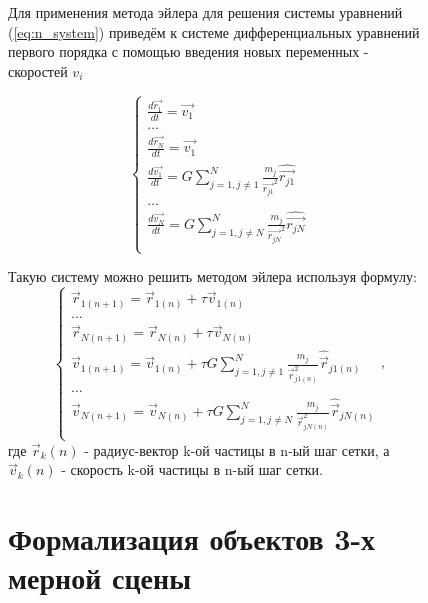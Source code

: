 \begin{figure}[h]
Для применения метода эйлера для решения системы уравнений (\ref{eq:n_system}) приведём к системе дифференциальных уравнений первого порядка с помощью введения новых переменных - скоростей $v_i$ 

\begin{equation}
	\label{n_system_velocities}
	\begin{cases}
		\frac{d\vec{r_1}}{dt} = \vec{v_1} \\
		\dots \\
		\frac{d\vec{r_N}}{dt} = \vec{v_1} \\
		
		\frac{d\vec{v_1}}{dt} = G\sum_{j=1, j \neq 1}^{N}{\frac{m_j}{\vec{r_{j1}}^2}\hat{\vec{r_{j1}}}} \\
		\dots \\
		\frac{d\vec{v_N}}{dt} = G\sum_{j=1, j \neq N}^{N}{\frac{m_j}{\vec{r_{jN}}^2}\hat{\vec{r_{jN}}}} \\
	\end{cases}
\end{equation}

Такую систему можно решить методом эйлера используя формулу:
\begin{equation}
	\label{n_euler_velocities}
	\begin{cases}
		\vec{r}_{1(n+1)} = \vec{r}_{1(n)} + \tau \vec{v}_{1(n)} \\
		\dots \\
		\vec{r}_{N(n+1)} = \vec{r}_{N(n)} + \tau \vec{v}_{N(n)} \\
		
		
		\vec{v}_{1(n+1)} = \vec{v}_{1(n)} + \tau G\sum_{j=1, j \neq 1}^{N}{\frac{m_j}{\vec{r}_{j1(n)}^2}\hat{\vec{r}}_{j1(n)}} \\
		\dots \\
		\vec{v}_{N(n+1)} = \vec{v}_{N(n)} + \tau G\sum_{j=1, j \neq N}^{N}{\frac{m_j}{\vec{r}_{jN(n)}^2}\hat{\vec{r}}_{jN(n)}} \\
	\end{cases},
\end{equation}
где $\vec{r}_k(n)$ - радиус-вектор k-ой частицы в n-ый шаг сетки, а $\vec{v}_k(n)$ - скорость k-ой частицы в n-ый шаг сетки.


\section{Формализация объектов 3-х мерной сцены}


\end{figure}
